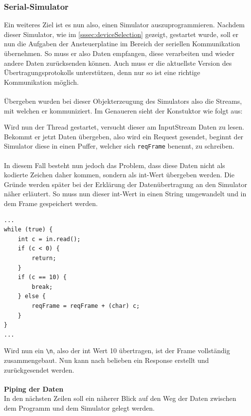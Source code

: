 \subsubsection{Serial-Simulator}\label{sssec:serialSim}
Ein weiteres Ziel ist es nun also, einen Simulator auszuprogrammieren.
Nachdem dieser Simulator, wie im \autoref{sssec:deviceSelection} gezeigt, gestartet wurde, soll er nun die Aufgaben der Ansteuerplatine im Bereich der seriellen Kommunikation übernehmen.
So muss er also Daten empfangen, diese verarbeiten und wieder andere Daten zurücksenden können.
Auch muss er die aktuellste Version des Übertragungsprotokolls unterstützen, denn nur so ist eine richtige Kommunikation möglich.\\\\
Übergeben wurden bei dieser Objekterzeugung des Simulators also die Streams, mit welchen er kommuniziert.
Im Genaueren sieht der Konstuktor wie folgt aus:

Wird nun der Thread gestartet, versucht dieser am InputStream Daten zu lesen.
Bekommt er jetzt Daten übergeben, also wird ein Request gesendet, beginnt der Simulator diese in einen Puffer, welcher sich \lstinline[style=java]{reqFrame} benennt, zu schreiben.\\\\
In diesem Fall besteht nun jedoch das Problem, dass diese Daten nicht als kodierte Zeichen daher kommen, sondern als int-Wert übergeben werden.
Die Gründe werden später bei der Erklärung der Datenübertragung an den Simulator näher erläutert.
So muss nun dieser int-Wert in einen String umgewandelt und in dem Frame gespeichert werden.
\begin{lstlisting}[style=java,caption=Teilabschnitt Methode run(),label=stringParse]
...
while (true) {
    int c = in.read();
    if (c < 0) {
        return;
    }
    if (c == 10) {
        break;
    } else {
        reqFrame = reqFrame + (char) c;
    }
}
...
\end{lstlisting}
Wird nun ein \verb!\n!, also der int Wert 10 übertragen, ist der Frame vollständig zusammengebaut.
Nun kann nach belieben ein Response erstellt und zurückgesendet werden.\\\\
\textbf{Piping der Daten}\\
In den nächsten Zeilen soll ein näherer Blick auf den Weg der Daten zwischen dem Programm und dem Simulator gelegt werden.\\
